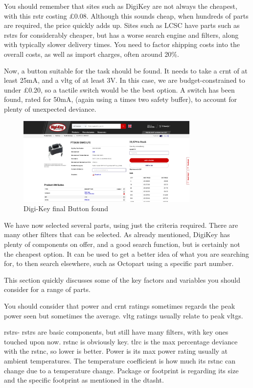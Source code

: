 \documentclass[a4paper,11pt]{report}
\begin{document}
You should remember that sites such as DigiKey are not always the cheapest, with this \gls{rstr} costing £0.08. Although this sounds cheap, when hundreds of parts are required, the price quickly adds up. Sites such as LCSC have parts such as \gls{rstr}s for considerably cheaper, but has a worse search engine and filters, along with typically slower delivery times. You need to factor shipping costs into the overall costs, as well as import charges, often around 20\%.

Now, a button suitable for the task should be found. It needs to take a \gls{crnt} of at least 25mA, and a \gls{vltg} of at least 3V. In this case, we are budget-constrained to under £0.20, so a tactile switch would be the best option. A switch has been found, rated for 50mA, (again using a times two safety buffer), to account for plenty of unexpected deviance.

\begin{figure}[H]
\centering
\includegraphics[width=0.8\textwidth]{screenshots/DigiKeyButton}
\caption{Digi-Key final Button found}
\end{figure}

We have now selected several parts, using just the criteria required. There are many other filters that can be selected. As already mentioned, DigiKey has plenty of components on offer, and a good search function, but is certainly not the cheapest option. It can be used to get a better idea of what you are searching for, to then search elsewhere, such as Octopart using a specific part number.

This section quickly discusses some of the key factors and variables you should consider for a range of parts.

You should consider that power and \gls{crnt} ratings sometimes regards the peak power seen but sometimes the average. \gls{vltg} ratings usually relate to peak \gls{vltg}s.

\gls{rstr}s- \gls{rstr}s are basic components, but still have many filters, with key ones touched upon now. \gls{rstnc} is obviously key. \gls{tlrc} is the max percentage deviance with the \gls{rstnc}, so lower is better. Power is its max power rating usually at ambient temperatures. The temperature coefficient is how much its \gls{rstnc} can change due to a temperature change. Package or footprint is regarding its size and the specific footprint as mentioned in the \gls{dtasht}.
\end{document}
